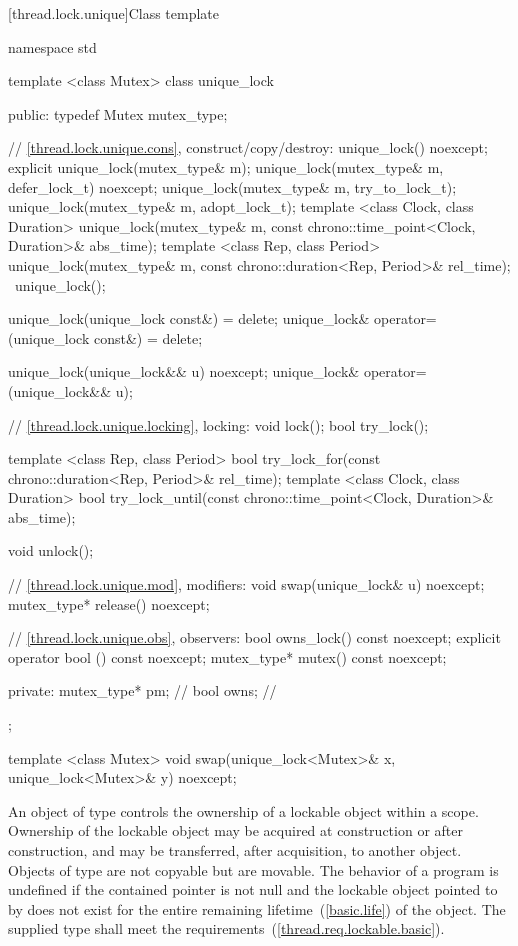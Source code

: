 \begin{itemdescr}
\pnum\effects {}
\end{itemdescr}

[thread.lock.unique]{Class template }

\begin{codeblock}
namespace std {
  template <class Mutex>
  class unique_lock {
  public:
    typedef Mutex mutex_type;

    // \ref{thread.lock.unique.cons}, construct/copy/destroy:
    unique_lock() noexcept;
    explicit unique_lock(mutex_type& m);
    unique_lock(mutex_type& m, defer_lock_t) noexcept;
    unique_lock(mutex_type& m, try_to_lock_t);
    unique_lock(mutex_type& m, adopt_lock_t);
    template <class Clock, class Duration>
      unique_lock(mutex_type& m, const chrono::time_point<Clock, Duration>& abs_time);
    template <class Rep, class Period>
      unique_lock(mutex_type& m, const chrono::duration<Rep, Period>& rel_time);
    ~unique_lock();

    unique_lock(unique_lock const&) = delete;
    unique_lock& operator=(unique_lock const&) = delete;

    unique_lock(unique_lock&& u) noexcept;
    unique_lock& operator=(unique_lock&& u);

    // \ref{thread.lock.unique.locking}, locking:
    void lock();
    bool try_lock();

    template <class Rep, class Period>
      bool try_lock_for(const chrono::duration<Rep, Period>& rel_time);
    template <class Clock, class Duration>
      bool try_lock_until(const chrono::time_point<Clock, Duration>& abs_time);

    void unlock();

    // \ref{thread.lock.unique.mod}, modifiers:
    void swap(unique_lock& u) noexcept;
    mutex_type* release() noexcept;

    // \ref{thread.lock.unique.obs}, observers:
    bool owns_lock() const noexcept;
    explicit operator bool () const noexcept;
    mutex_type* mutex() const noexcept;

  private:
    mutex_type* pm; // \expos
    bool owns;      // \expos
  };

  template <class Mutex>
    void swap(unique_lock<Mutex>& x, unique_lock<Mutex>& y) noexcept;
}
\end{codeblock}

\pnum
An object of type  controls the ownership of a lockable
object within a scope. Ownership of the lockable object may be acquired at
construction or after construction, and may be transferred, after
acquisition, to another  object. Objects of type  are not
copyable but are movable. The behavior of a program is undefined if the contained pointer
 is not null and the lockable object pointed
to by  does not exist for the entire remaining
lifetime~(\ref{basic.life}) of the  object. The supplied
 type shall meet the 
requirements~(\ref{thread.req.lockable.basic}).

